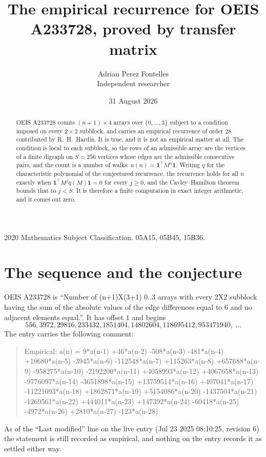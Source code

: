\documentclass[11pt,a4paper]{article}
\title{The empirical recurrence for OEIS A233728, proved by transfer matrix}
\author{Adrian Perez Fontelles\\ \small Independent researcher}
\date{31 August 2026}
\theoremstyle{plain}
\theoremstyle{definition}
\begin{document}
\maketitle

\begin{abstract}
OEIS A233728 counts $(n+1)\times4$ arrays over $\{0,\dots,3\}$ subject to a condition imposed on
every $2\times2$ subblock, and carries an empirical recurrence of order $28$ contributed
by R.~H.~Hardin. It is true, and it is not an empirical matter at all. The condition is local
to each subblock, so the rows of an admissible array are the vertices of a finite digraph
on $S=256$ vertices whose edges are the admissible consecutive pairs, and the count is a
number of walks: $a(n)=\mathbf{1}^{\!\top}M^{n}\mathbf{1}$. Writing $q$
for the characteristic polynomial of the conjectured recurrence, the recurrence holds for all
$n$ exactly when $\mathbf{1}^{\!\top}M^{j}q(M)\mathbf{1}=0$ for every $j\ge0$, and the
Cayley--Hamilton theorem bounds that to $j<S$. It is therefore a finite computation in exact
integer arithmetic, and it comes out zero.
\end{abstract}

\noindent\small 2020 Mathematics Subject Classification. 05A15, 05B45, 15B36.\normalsize

\section{The sequence and the conjecture}

OEIS A233728 is ``Number of (n+1)X(3+1) 0..3 arrays with every 2X2 subblock having the sum of the absolute values of the edge differences equal to 6 and no adjacent elements equal.''. It has offset $1$ and begins
\[
556, 3972, 29816, 233432, 1851404, 14802604, 118695412, 953471940,\ \dots
\]
The entry carries the following comment:
\begin{quote}\small
Empirical: a(n) = 9*a(n-1) +46*a(n-2) -508*a(n-3) -481*a(n-4) +10680*a(n-5) -3945*a(n-6) -112548*a(n-7) +115263*a(n-8) +657688*a(n-9) -958275*a(n-10) -2192200*a(n-11) +4058993*a(n-12) +4067658*a(n-13) -9776097*a(n-14) -3651898*a(n-15) +13759514*a(n-16) +407041*a(n-17) -11221093*a(n-18) +1862871*a(n-19) +5154086*a(n-20) -1437504*a(n-21) -1269561*a(n-22) +444011*a(n-23) +147392*a(n-24) -60418*a(n-25) -4972*a(n-26) +2810*a(n-27) -123*a(n-28)
\end{quote}
As of the ``Last modified'' line on the live entry (Jul 23 2025 08:10:25, revision 6) the statement is
still recorded as empirical, and nothing on the entry records it as settled either way.
\end{document}
